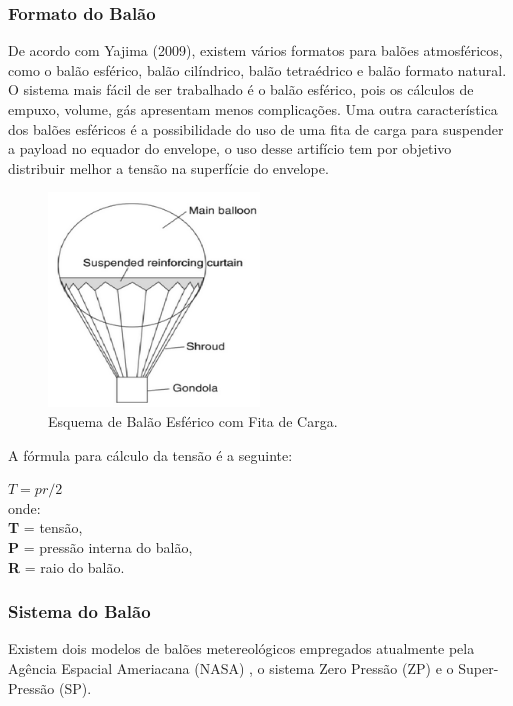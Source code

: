 \subsubsection{Formato do Balão}
	De acordo com Yajima (2009), existem vários formatos para balões atmosféricos, como o balão esférico, balão cilíndrico, balão tetraédrico e balão formato natural. O sistema mais fácil de ser trabalhado é o balão esférico, pois os cálculos de empuxo, volume, gás  apresentam menos complicações. Uma outra característica dos balões esféricos é a possibilidade do uso de uma fita de carga para suspender a payload no equador do envelope, o uso desse artifício tem por objetivo distribuir melhor a tensão na superfície do envelope.

	\begin{figure}[H]
		\centering
		\includegraphics[width=0.5\textwidth]{figuras/balaoEsferico}
		\caption{Esquema de Balão Esférico com Fita de Carga.}
		\label{img:balaoEsferico}
	\end{figure}

	A fórmula para cálculo da tensão é a seguinte:

	$T = pr/2$ \\
	onde: \\
	\textbf{T} = tensão, \\ 
	\textbf{P} = pressão interna do balão, \\
	\textbf{R} = raio do balão. \\

\subsubsection{Sistema do Balão}

	Existem dois modelos de balões metereológicos empregados atualmente pela Agência Espacial Ameriacana (NASA) , o sistema Zero Pressão (ZP) e o Super-Pressão (SP). 
	
